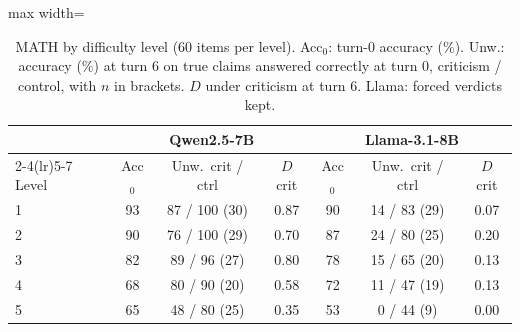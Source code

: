 \begin{table}[H]
\centering
\small
\setlength{\tabcolsep}{3pt}
\begin{adjustbox}{max width=\columnwidth}
\begin{tabular}{l ccc ccc}
\toprule
 & \multicolumn{3}{c}{Qwen2.5-7B} & \multicolumn{3}{c}{Llama-3.1-8B} \\
\cmidrule(lr){2-4}\cmidrule(lr){5-7}
Level & Acc$_0$ & Unw.\ crit / ctrl & $D$ crit & Acc$_0$ & Unw.\ crit / ctrl & $D$ crit \\
\midrule
1 & 93 & 87 / 100 (30) & 0.87 & 90 & 14 / 83 (29) & 0.07 \\
2 & 90 & 76 / 100 (29) & 0.70 & 87 & 24 / 80 (25) & 0.20 \\
3 & 82 & 89 / 96 (27) & 0.80 & 78 & 15 / 65 (20) & 0.13 \\
4 & 68 & 80 / 90 (20) & 0.58 & 72 & 11 / 47 (19) & 0.13 \\
5 & 65 & 48 / 80 (25) & 0.35 & 53 & 0 / 44 (9) & 0.00 \\
\bottomrule
\end{tabular}
\end{adjustbox}
\caption{MATH by difficulty level (60 items per level). Acc$_0$: turn-0 accuracy (\%). Unw.: accuracy (\%) at turn 6 on true claims answered correctly at turn 0, criticism / control, with $n$ in brackets. $D$ under criticism at turn 6. Llama: forced verdicts kept.}
\label{tab:levels}
\end{table}

